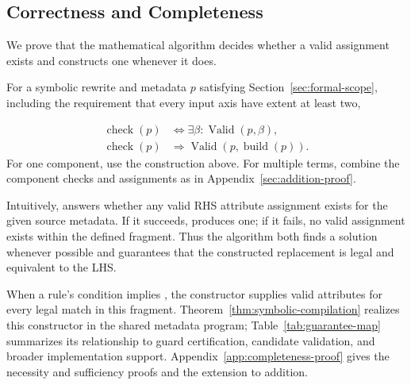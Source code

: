 \subsection{Correctness and Completeness}
\label{sec:formal-correctness}
We prove that the mathematical algorithm decides whether a valid assignment
exists and constructs one whenever it does.

\begin{theorem}
\label{thm:complete-synthesis}
For a symbolic rewrite and metadata $p$ satisfying
Section~\ref{sec:formal-scope}, including the requirement that every input
axis have extent at least two,

\begin{align}
 \operatorname{check}(p)&\iff\exists\beta:\operatorname{Valid}(p,\beta),
 \label{eq:complete-theorem}\\
 \operatorname{check}(p)&\Rightarrow
 \operatorname{Valid}(p,\operatorname{build}(p)).
 \label{eq:sound-theorem}
\end{align}
For one component, use the construction above.
For multiple terms, combine the component checks and assignments as in
Appendix~\ref{sec:addition-proof}.
\end{theorem}
Intuitively,  answers whether any valid RHS attribute assignment
exists for the given source metadata. If it succeeds,  produces
one; if it fails, no valid assignment exists within the defined fragment.
Thus the algorithm both finds a solution whenever possible and guarantees
that the constructed replacement is legal and equivalent to the LHS.

When a rule's  condition implies , the constructor
supplies valid attributes for every legal match in this fragment.
Theorem~\ref{thm:symbolic-compilation} realizes this constructor in the shared metadata program;
Table~\ref{tab:guarantee-map} summarizes its relationship to guard certification,
candidate validation, and broader implementation support.
Appendix~\ref{app:completeness-proof}
gives the necessity and sufficiency proofs and the extension to addition.
